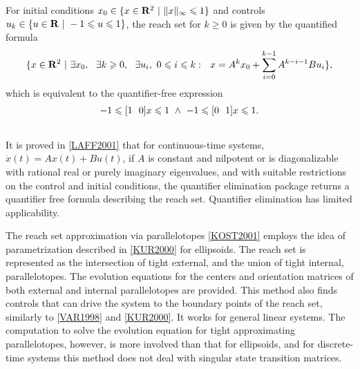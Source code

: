 \documentclass[letterpaper,10pt,english]{sphinxmanual}
\begin{document}
For initial conditions $x_0\in\{x\in {\bf R}^2 ~|~ \|x\|_{\infty} \leqslant1\}$ and
controls $u_k\in\{u\in {\bf R} ~|~ -1\leqslant u\leqslant1\}$, the
reach set for $k\geqslant0$ is given by the quantified formula
\begin{gather}
\begin{split}\{ x\in{\bf R}^2 ~|~ \exists x_0, ~~ \exists k\geqslant0, ~~
\exists u_i, ~ 0\leqslant i\leqslant k: ~~
x = A^kx_0+\sum_{i=0}^{k-1}A^{k-i-1}Bu_i \},\end{split}\notag
\end{gather}
which is equivalent to the quantifier-free expression
\begin{gather}
\begin{split}-1\leqslant[1 ~~ 0]x\leqslant1 ~ \wedge ~ -1\leqslant[0 ~~ 1]x\leqslant1.\end{split}\notag\\\begin{split}\end{split}\notag
\end{gather}
It is proved in {\hyperref[main_source:laff2001]{{[}LAFF2001{]}}} that for
continuous-time systems, $\dot{x}(t) = Ax(t) + Bu(t)$, if
$A$ is constant and nilpotent or is diagonalizable with rational
real or purely imaginary eigenvalues, and with suitable restrictions on
the control and initial conditions, the quantifier elimination package
returns a quantifier free formula describing the reach set. Quantifier
elimination has limited applicability.

The reach set approximation via parallelotopes {\hyperref[main_source:kost2001]{{[}KOST2001{]}}} employs
the idea of parametrization described in {\hyperref[main_source:kur2000]{{[}KUR2000{]}}}
for ellipsoids. The reach set is represented as the intersection of
tight external, and the union of tight internal, parallelotopes. The
evolution equations for the centers and orientation matrices of both
external and internal parallelotopes are provided. This method also
finds controls that can drive the system to the boundary points of the
reach set, similarly to {\hyperref[main_source:var1998]{{[}VAR1998{]}}} and {\hyperref[main_source:kur2000]{{[}KUR2000{]}}}.
It works for general linear systems. The computation to solve
the evolution equation for tight approximating parallelotopes, however,
is more involved than that for ellipsoids, and for discrete-time systems
this method does not deal with singular state transition matrices.
\end{document}
